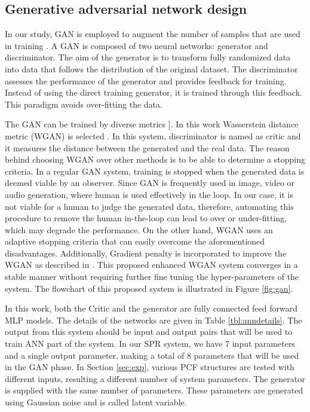 \documentclass[10pt]{IEEEtran}
\begin{document}
\subsection{Generative adversarial network design}
\label{ssec:gan}

In our study, GAN is employed to augment the number of samples that are used in training  \cite{goodfellow2014generative}.  A GAN is composed of two neural networks: generator and discriminator. The aim of the generator is to transform fully randomized data into data that follows the distribution of the original dataset. The discriminator assesses the performance of the generator and provides feedback for training. Instead of using the direct training generator, it is trained through this feedback. This paradigm avoids over-fitting the data.

The GAN can be trained by diverse metrics  \cite{goodfellow2014generative, mao2017least, lucic2018gans}]. In this work Wasserstein distance metric (WGAN) is selected \cite{arjovsky2017wasserstein}. In this system, discriminator is named as critic and it measures the distance between the generated  and the real data. The reason behind choosing WGAN over other methods is to be able to determine a stopping criteria. In a regular GAN system, training is stopped when the generated data is deemed viable by an observer. Since GAN is frequently used in image, video or audio generation, where human is used effectively in the loop. In our case, it is not viable for a human to judge the generated data, therefore, automating this procedure to remove the human in-the-loop can lead to over or under-fitting, which may degrade the performance. On the other hand, WGAN uses an adaptive stopping criteria that can easily overcome the aforementioned disadvantages. Additionally, Gradient penalty is incorporated to improve the WGAN as described in \cite{gulrajani2017improved}. This proposed enhanced WGAN system converges in a stable manner without requiring further fine tuning the hyper-parameters of the system. The flowchart of this proposed system is illustrated in Figure  \ref{fig:gan}.

In this work, both the Critic and the generator are fully connected feed forward MLP models. The details of the networks are given in Table \ref{tbl:anndetails}. The output from this system should be input and output pairs that will be used to train ANN part of the system. In our SPR system, we have 7 input parameters and a single output parameter, making a total of 8 parameters that will be used in the GAN phase. In Section \ref{sec:exp}, various PCF structures are tested with different inputs, resulting a different number of system parameters. The generator is supplied with the same number of parameters. These parameters are generated using Gaussian noise and is called latent variable.
\end{document}
